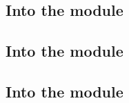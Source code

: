 \subsection{Into the \rlpTxnRcptMod{} module}   \label{log info: lookups: txn rlp}      
\subsection{Into the \logDataMod{} module}      \label{log info: lookups: log data}     
\subsection{Into the \hubMod{} module}          \label{log info: lookups: batch data}   

